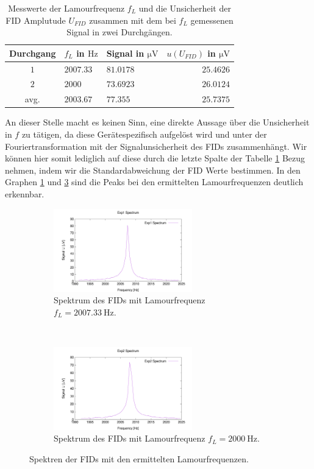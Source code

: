 \documentclass{article}
\begin{document}
    \begin{table}[h]
        \centering
        \begin{tabular}{c|l|l|r}
            \textbf{Durchgang} & $f_L$ in $\si{\hertz}$ & Signal in $\si{\micro\volt}$ & $u(U_{\textit{FID}})$ in $\si{\micro\volt}$\\
            \hline
            $1$ & $2007.33$ & $81.0178$ & $25.4626$\\
            $2$ & $2000$ & $73.6923$ & $26.0124$ \\
            \hline 
            avg. & $2003.67$ & $77.355$ & $25.7375$
        \end{tabular}
        \caption{Messwerte der Lamourfrequenz $f_L$ und die Unsicherheit der FID Amplutude $U_{\textit{FID}}$ zusammen mit dem bei $f_L$ gemessenen Signal in zwei Durchgängen.}
        \label{tab:2:Lamour_Freq}
    \end{table}
    An dieser Stelle macht es keinen Sinn, eine direkte Aussage über die Unsicherheit in $f$ zu tätigen, da diese Gerätespezifisch aufgelöst wird und unter der Fouriertransformation mit der Signalunsicherheit des FIDs zusammenhängt. Wir können hier somit lediglich auf diese durch die letzte Spalte der Tabelle \ref{tab:2:Lamour_Freq} Bezug nehmen, indem wir die Standardabweichung der FID Werte bestimmen. In den Graphen \ref{fig:2:Spectrum-1} und \ref{fig:2:Spectrum-2} sind die Peaks bei den ermittelten Lamourfrequenzen deutlich erkennbar.
    \begin{figure}[h]
        \centering
        \begin{subfigure}[b]{0.4\textwidth}
            \includegraphics[width=6cm]{../Bilddateien/Exp1_Spectrum.png}
            \caption{Spektrum des FIDs mit Lamourfrequenz $f_L = \SI{2007.33}{\hertz}$.}
            \label{fig:2:Spectrum-1}
        \end{subfigure}
        \
        \begin{subfigure}[b]{0.4\textwidth}
            \includegraphics[width=6cm]{../Bilddateien/Exp2_Spectrum.png}
            \caption{Spektrum des FIDs mit Lamourfrequenz $f_L = \SI{2000}{\hertz}$.}
            \label{fig:2:Spectrum-2}
        \end{subfigure}
        \caption{Spektren der FIDs mit den ermittelten Lamourfrequenzen.}
    \end{figure}
\end{document}
